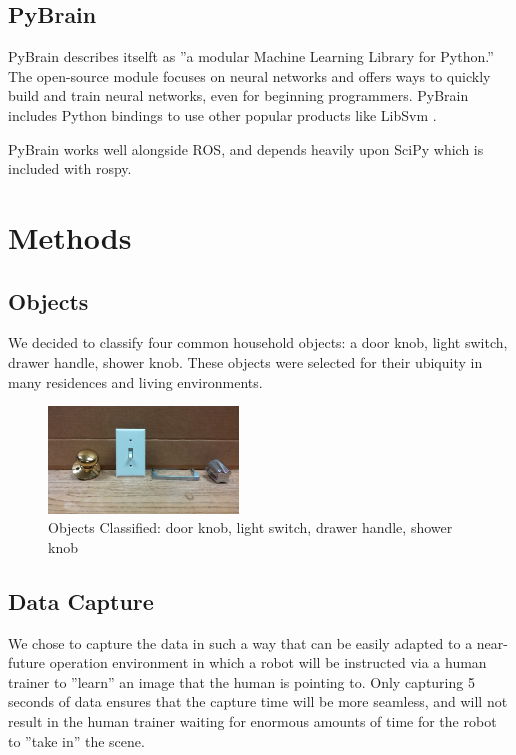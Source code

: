 \documentclass{article}
\begin{document}
\subsection{PyBrain}
PyBrain describes itselft as ''a modular Machine Learning Library for Python.'' The open-source module focuses on neural networks and offers ways to quickly build and train neural networks, even for beginning programmers. PyBrain includes Python bindings to use other popular products like LibSvm \cite{pybrain, pybrainCode}.  

PyBrain works well alongside ROS, and depends heavily upon SciPy which is included with rospy.

\section{Methods}
\subsection{Objects}
We decided to classify four common household objects: a door knob, light switch, drawer handle, shower knob. These objects were selected
for their ubiquity in many residences and living environments. 

\begin{figure}[h!]
    \centering
    \includegraphics[width=0.45\textwidth]{All_Knobs.jpg}
    \caption{Objects Classified: door knob, light switch, drawer handle, shower knob}
    \label{fig:objects}
\end{figure}

\subsection{Data Capture}
We chose to capture the data in such a way that can be easily adapted to a near-future operation environment in which a robot will be instructed via a human trainer to ''learn'' an image that the human is pointing to.  Only capturing 5 seconds of data ensures that the capture time will be more seamless, and will not result in the human trainer waiting for enormous amounts of time for the robot to ''take in'' the scene.  
\end{document}
